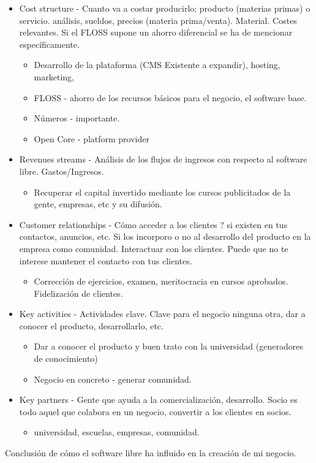 \documentclass{article}
\begin{document}
\begin{itemize}
    \item Cost structure - Cuanto va a costar producirlo; producto
    (materias primas) o servicio. análisis, sueldos, precios
    (materia prima/venta). Material. Costes relevantes. Si el FLOSS supone un
    ahorro diferencial se ha de mencionar específicamente.
    \begin{itemize}
        \item Desarrollo de la plataforma (CMS Existente a expandir), hosting, marketing,
        \item FLOSS - ahorro de los recursos básicos para el negocio, el software base.
        \item Números - importante.
        \item Open Core - platform provider
    \end{itemize}
    
    \item Revenues streams - Análisis de los flujos de ingresos con respecto al
    software libre. Gastos/Ingresos.
    \begin{itemize}
        \item Recuperar el capital invertido mediante los cursos publicitados de la gente, empresas, etc y su difusión.
    \end{itemize}
    
    
    \item Customer relationships - Cómo acceder a los clientes ? si existen en
    tus contactos, anuncios, etc. Si los incorporo o no al desarrollo del producto
    en la empresa como comunidad. Interactuar con los clientes. Puede que no te
    interese mantener el contacto con tus clientes.
    
    \begin{itemize}
        \item Corrección de ejercicios, examen, meritocracia en cursos aprobados. Fidelización de clientes.
    \end{itemize}
    
    
    \item Key activities - Actividades clave. Clave para el negocio ninguna otra,
    dar a conocer el producto, desarrollarlo, etc.
    \begin{itemize}
        \item Dar a conocer el producto y buen trato con la universidad (generadores de conocimiento)
        \item Negocio en concreto - generar comunidad.
    \end{itemize}
    
    
    \item Key partners - Gente que ayuda a la comercialización, desarrollo.
    Socio es todo aquel que colabora en un negocio, convertir a los clientes en socios.
    \begin{itemize}
        \item universidad, escuelas, empresas, comunidad.
    \end{itemize}
    
    
\end{itemize}

Conclusión de cómo el software libre ha influido en la creación de mi negocio.
\end{document}
